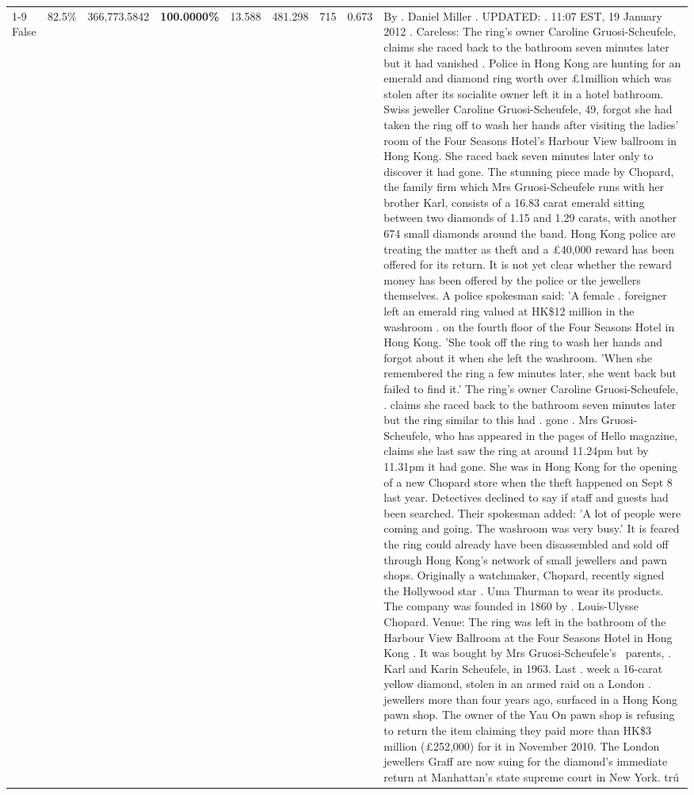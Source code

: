 \begin{table}[H]
\begin{tabular}{lllrlllll}
\cline{1-9}
False & 82.5\% & 366,773.5842 & \bfseries \color{red} 100.0000\% & 13.588 & 481.298 & 715 & 0.673 & By . Daniel Miller . UPDATED: . 11:07 EST, 19 January 2012 . Careless: The ring's owner Caroline Gruosi-Scheufele, claims she raced back to the bathroom seven minutes later but it had vanished . Police in Hong Kong are hunting for an emerald and diamond ring worth over £1million which was stolen after its socialite owner left it in a hotel bathroom. Swiss jeweller Caroline Gruosi-Scheufele, 49, forgot she had taken the ring off to wash her hands after visiting the ladies' room of the Four Seasons Hotel's Harbour View ballroom in Hong Kong. She raced back seven minutes later only to discover it had gone. The stunning piece made by Chopard, the family firm which Mrs Gruosi-Scheufele runs with her brother Karl, consists of a 16.83 carat emerald sitting between two diamonds of 1.15 and 1.29 carats, with another 674 small diamonds around the band. Hong Kong police are treating the matter as theft and a £40,000 reward has been offered for its return. It is not yet clear whether the reward money has been offered by the police or the jewellers themselves. A police spokesman said: 'A female . foreigner left an emerald ring valued at HK\$12 million in the washroom . on the fourth floor of the Four Seasons Hotel in Hong Kong. 'She took off the ring to wash her hands and forgot about it when she left the washroom. 'When she remembered the ring a few minutes later, she went back but failed to find it.' The ring's owner Caroline Gruosi-Scheufele, . claims she raced back to the bathroom seven minutes later but the ring similar to this had . gone . Mrs Gruosi-Scheufele, who has appeared in the pages of Hello magazine, claims she last saw the ring at around 11.24pm but by 11.31pm it had gone. She was in Hong Kong for the opening of a new Chopard store when the theft happened on Sept 8 last year. Detectives declined to say if staff and guests had been searched. Their spokesman added: 'A lot of people were coming and going. The washroom was very busy.' It is feared the ring could already have been disassembled and sold off through Hong Kong's network of small jewellers and pawn shops. Originally a watchmaker, Chopard, recently signed the Hollywood star . Uma Thurman to wear its products. The company was founded in 1860 by . Louis-Ulysse Chopard. Venue: The ring was left in the bathroom of the Harbour View Ballroom at the Four Seasons Hotel in Hong Kong . It was bought by Mrs Gruosi-Scheufele's  parents, . Karl and Karin Scheufele, in 1963. Last . week a 16-carat yellow diamond, stolen in an armed raid on a London . jewellers more than four years ago, surfaced in a Hong Kong pawn shop. The owner of the Yau On pawn shop is refusing to return the item claiming they paid more than HK\$3 million (£252,000) for it in November 2010. The London jewellers Graff are now suing for the diamond’s immediate return at Manhattan’s state supreme court in New York. trú \\

\end{tabular}
\end{table}
